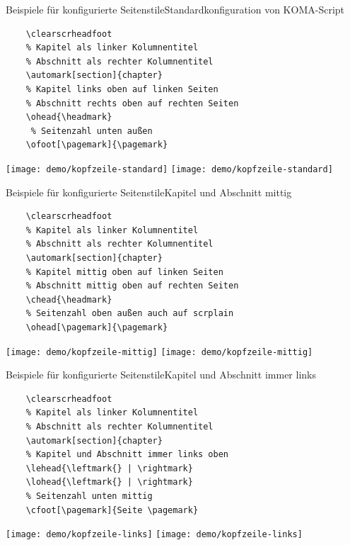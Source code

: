 \begin{Frame}[t,fragile]{Beispiele für konfigurierte Seitenstile}{Standardkonfiguration von KOMA-Script}
  \begin{lstlisting}[gobble=4]
    % Alles löschen
    \clearscrheadfoot
    % Kapitel als linker Kolumnentitel
    % Abschnitt als rechter Kolumnentitel
    \automark[section]{chapter}
    % Kapitel links oben auf linken Seiten
    % Abschnitt rechts oben auf rechten Seiten
    \ohead{\headmark}
     % Seitenzahl unten außen
    \ofoot[\pagemark]{\pagemark}
  \end{lstlisting}

  \centerline{%
    \texttt{[image: demo/kopfzeile-standard]}%
    \texttt{[image: demo/kopfzeile-standard]}%
  }
\end{Frame}

\begin{Frame}[t,fragile]{Beispiele für konfigurierte Seitenstile}{Kapitel und Abschnitt mittig}
  \begin{lstlisting}[gobble=4]
    % Alles löschen
    \clearscrheadfoot
    % Kapitel als linker Kolumnentitel
    % Abschnitt als rechter Kolumnentitel
    \automark[section]{chapter}
    % Kapitel mittig oben auf linken Seiten
    % Abschnitt mittig oben auf rechten Seiten
    \chead{\headmark}
    % Seitenzahl oben außen auch auf scrplain
    \ohead[\pagemark]{\pagemark}
  \end{lstlisting}

  \centerline{%
    \texttt{[image: demo/kopfzeile-mittig]}%
    \texttt{[image: demo/kopfzeile-mittig]}%
  }
\end{Frame}

\begin{Frame}[t,fragile]{Beispiele für konfigurierte Seitenstile}{Kapitel und Abschnitt immer links}
  \begin{lstlisting}[gobble=4]
    % Alles löschen
    \clearscrheadfoot
    % Kapitel als linker Kolumnentitel
    % Abschnitt als rechter Kolumnentitel
    \automark[section]{chapter}
    % Kapitel und Abschnitt immer links oben
    \lehead{\leftmark{} | \rightmark}
    \lohead{\leftmark{} | \rightmark}
    % Seitenzahl unten mittig
    \cfoot[\pagemark]{Seite \pagemark}
  \end{lstlisting}

  \centerline{%
    \texttt{[image: demo/kopfzeile-links]}%
    \texttt{[image: demo/kopfzeile-links]}%
  }
\end{Frame}

